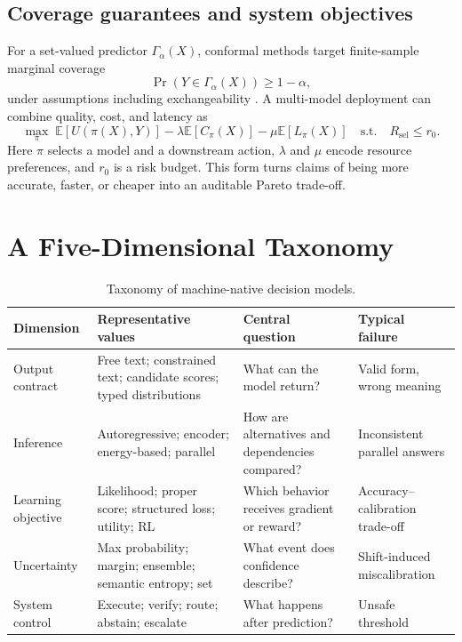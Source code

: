 \documentclass[11pt]{article}
\begin{document}
\subsection{Coverage guarantees and system objectives}

For a set-valued predictor $\Gamma_\alpha(X)$, conformal methods target finite-sample marginal coverage
\begin{equation}
\Pr\!\left(Y\in\Gamma_\alpha(X)\right)\geq 1-\alpha,
\end{equation}
under assumptions including exchangeability \cite{quach2024conformal}. A multi-model deployment can combine quality, cost, and latency as
\begin{equation}
\max_{\pi}\;\mathbb E[U(\pi(X),Y)]-\lambda\mathbb E[C_\pi(X)]-\mu\mathbb E[L_\pi(X)]
\quad\text{s.t.}\quad R_{\mathrm{sel}}\leq r_0.
\end{equation}
Here $\pi$ selects a model and a downstream action, $\lambda$ and $\mu$ encode resource preferences, and $r_0$ is a risk budget. This form turns claims of being more accurate, faster, or cheaper into an auditable Pareto trade-off.

\section{A Five-Dimensional Taxonomy}

\begin{table}[t]
\centering\small
\begin{tabular}{p{.17\linewidth}p{.25\linewidth}p{.27\linewidth}p{.22\linewidth}}
\toprule
Dimension & Representative values & Central question & Typical failure \\
\midrule
Output contract & Free text; constrained text; candidate scores; typed distributions & What can the model return? & Valid form, wrong meaning \\
Inference & Autoregressive; encoder; energy-based; parallel & How are alternatives and dependencies compared? & Inconsistent parallel answers \\
Learning objective & Likelihood; proper score; structured loss; utility; RL & Which behavior receives gradient or reward? & Accuracy--calibration trade-off \\
Uncertainty & Max probability; margin; ensemble; semantic entropy; set & What event does confidence describe? & Shift-induced miscalibration \\
System control & Execute; verify; route; abstain; escalate & What happens after prediction? & Unsafe threshold \\
\bottomrule
\end{tabular}
\caption{Taxonomy of machine-native decision models.}
\label{tab:taxonomy}
\end{table}
\end{document}
